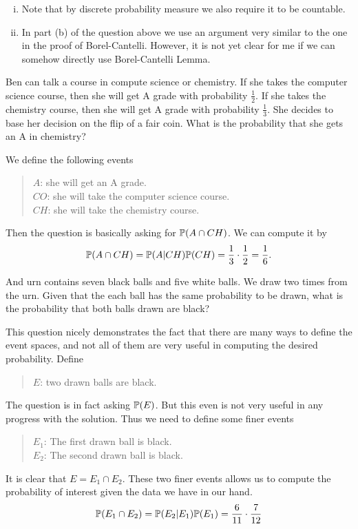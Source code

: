 \begin{remark} 
	\begin{enumerate}[(i)]
		\item Note that by discrete probability measure we also require it to be countable.
		\item In part (b) of the question above we use an argument very similar to the one in the proof of Borel-Cantelli. However, it is not yet clear for me if we can somehow directly use Borel-Cantelli Lemma.
	\end{enumerate}
\end{remark}


\begin{problem}
	Ben can talk a course in compute science or chemistry. If she takes the computer science course, then she will get A grade with probability $\frac{1}{2}$. If she takes the chemistry course, then she will get A grade with probability $\frac{1}{3}$. She decides to base her decision on the flip of a fair coin. What is the probability that she gets an A in chemistry?
\end{problem}
\begin{solution}
	We define the following events
	\begin{quote}
		$A$: she will get an A grade.\\
		$CO$: she will take the computer science course.\\
		$CH$: she will take the chemistry course.
	\end{quote}
	Then the question is basically asking for $\mathbb{P}(A \cap CH)$. We can compute it by
	\[ \mathbb{P}(A \cap CH) = \mathbb{P}(A|CH)\mathbb{P}(CH) = \frac{1}{3}\cdot\frac{1}{2} = \frac{1}{6}. \]
\end{solution}

\begin{problem}
	And urn contains seven black balls and five white balls. We draw two times from the urn. Given that the each ball has the same probability to be drawn, what is the probability that both balls drawn are black?
\end{problem}
\begin{solution}
	This question nicely demonstrates the fact that there are many ways to define the event spaces, and not all of them are very useful in computing the desired probability. Define
	\begin{quote}
		$E$: two drawn balls are black.
	\end{quote}
	The question is in fact asking $\mathbb{P}(E)$. But this even is not very useful in any progress with the solution. Thus we need to define some finer events
	\begin{quote}
		$E_1$: The first drawn ball is black.\\
		$E_2$: The second drawn ball is black.
	\end{quote}
	It is clear that $E = E_1 \cap E_2$. These two finer events allows us to compute the probability of interest given the data we have in our hand.
	\[ \mathbb{P}(E_1 \cap E_2) = \mathbb{P}(E_2 | E_1) \mathbb{P}(E_1) = \frac{6}{11} \cdot \frac{7}{12} \]
\end{solution}

